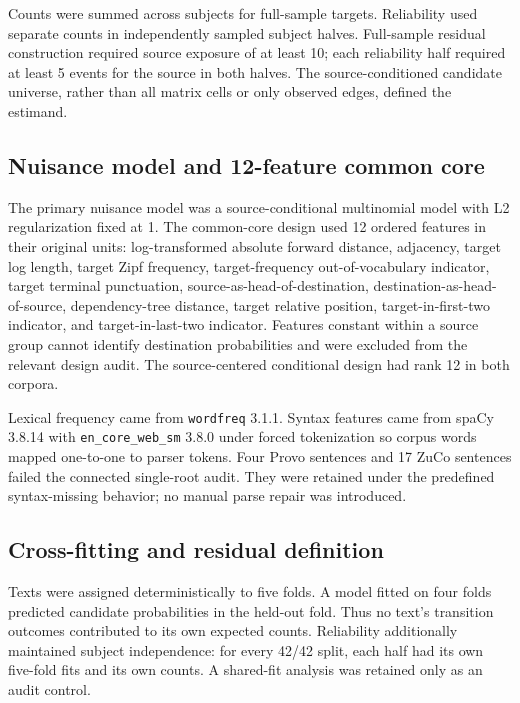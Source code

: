\documentclass[11pt]{article}
\begin{document}
Counts were summed across subjects for full-sample targets. Reliability used separate counts in independently sampled subject halves. Full-sample residual construction required source exposure of at least 10; each reliability half required at least 5 events for the source in both halves. The source-conditioned candidate universe, rather than all matrix cells or only observed edges, defined the estimand.

\subsection{Nuisance model and 12-feature common core}

The primary nuisance model was a source-conditional multinomial model with L2 regularization fixed at 1. The common-core design used 12 ordered features in their original units: log-transformed absolute forward distance, adjacency, target log length, target Zipf frequency, target-frequency out-of-vocabulary indicator, target terminal punctuation, source-as-head-of-destination, destination-as-head-of-source, dependency-tree distance, target relative position, target-in-first-two indicator, and target-in-last-two indicator. Features constant within a source group cannot identify destination probabilities and were excluded from the relevant design audit. The source-centered conditional design had rank 12 in both corpora.

Lexical frequency came from \texttt{wordfreq} 3.1.1. Syntax features came from spaCy 3.8.14 with \texttt{en\_core\_web\_sm} 3.8.0 under forced tokenization so corpus words mapped one-to-one to parser tokens. Four Provo sentences and 17 ZuCo sentences failed the connected single-root audit. They were retained under the predefined syntax-missing behavior; no manual parse repair was introduced.

\subsection{Cross-fitting and residual definition}

Texts were assigned deterministically to five folds. A model fitted on four folds predicted candidate probabilities in the held-out fold. Thus no text's transition outcomes contributed to its own expected counts. Reliability additionally maintained subject independence: for every 42/42 split, each half had its own five-fold fits and its own counts. A shared-fit analysis was retained only as an audit control.
\end{document}
